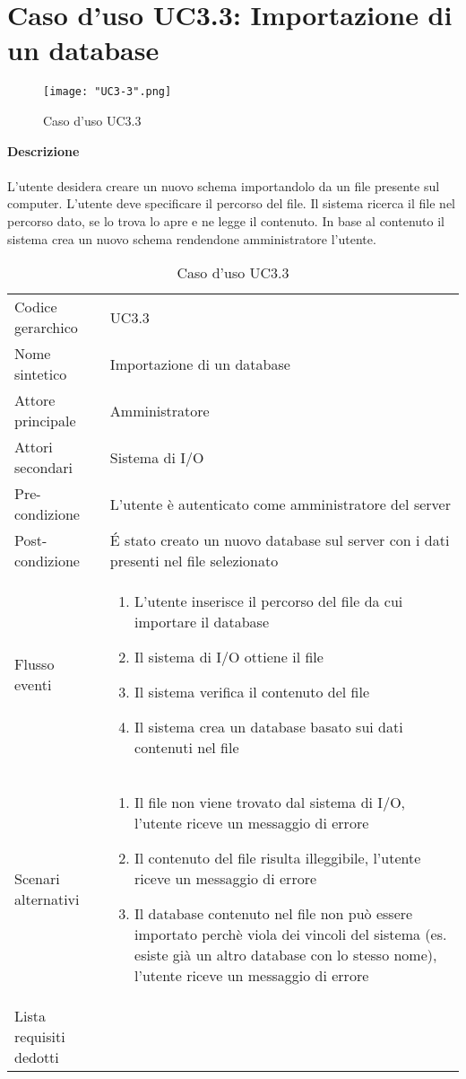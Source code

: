 \documentclass[a4paper]{report}
\begin{document}
	 \section{Caso d'uso UC3.3: Importazione di un database}
	 	\begin{figure}[H]
			\centering
			\texttt{[image: "UC3-3".png]}
			\caption{Caso d'uso UC3.3}
		\end{figure}
	 \textbf{Descrizione} \\ \\
	 L'utente desidera creare un nuovo schema importandolo da un file presente sul computer. L'utente
	  deve specificare il percorso del file. Il sistema ricerca il file nel percorso dato, se lo trova lo apre e ne 
	  legge il contenuto. In base al contenuto il sistema crea un nuovo schema rendendone amministratore
	  l'utente.
		\begin{table}[H]
		\begin{tabularx}{\textwidth}{X | X}\toprule
			\rowcolor{orange!65}Codice gerarchico & UC3.3 \\
			Nome sintetico & Importazione di un database \\
			\rowcolor{orange!65}Attore principale & Amministratore\\
			Attori secondari & Sistema di I/O \\
			\rowcolor{orange!65}Pre-condizione & L'utente è autenticato come amministratore del server\\
			Post-condizione & \'E stato creato un nuovo database sul server con i dati presenti nel file
			selezionato \\
			\rowcolor{orange!65}Flusso eventi & \begin{enumerate}
			\item L'utente inserisce il percorso del file da cui importare il database
			\item Il sistema di I/O ottiene il file
			\item Il sistema verifica il contenuto del file
			\item Il sistema crea un database basato sui dati contenuti nel file
			\end{enumerate} \\
			Scenari alternativi & \begin{enumerate}
			\item Il file non viene trovato dal sistema di I/O, l'utente riceve un messaggio di errore
			\item Il contenuto del file risulta illeggibile, l'utente riceve un messaggio di errore
			\item Il database contenuto nel file non può essere importato perchè viola dei vincoli del sistema 
			(es. esiste già un altro database con lo stesso nome), l'utente riceve un messaggio di errore
			\end{enumerate} \\
			\rowcolor{orange!65}Lista requisiti dedotti & \\
			\bottomrule
		\end{tabularx}
		\caption{Caso d'uso UC3.3}
	 \end{table}
\end{document}
